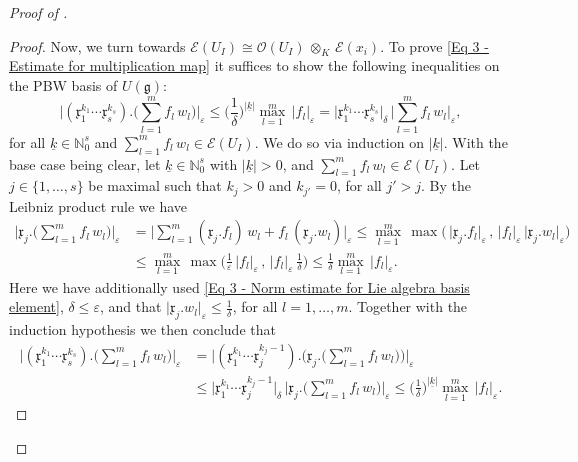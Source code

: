\documentclass[a4paper, reqno, 10pt]{amsart}
\theoremstyle{definition}
\numberwithin{equation}{section}
\newcommand{\abs}[1]{{\lvert{#1}\rvert}}
\newcommand{\botimes}[1]{{\,\otimes_{#1}\,}}
\newcommand{\ul}[1]{{\underline{#1}}}
\newcommand{\BN}{{\mathbb {N}}}
\newcommand{\CE}{{\mathcal {E}}}
\newcommand{\CO}{{\mathcal {O}}}
\newcommand{\Fg}{{\mathfrak {g}}}
\newcommand{\Fx}{{\mathfrak {x}}}
\begin{document}
\begin{proof}[{Proof of }]
\begin{proof}
	Now, we turn towards $\CE(U_I) \cong \CO(U_I) \botimes{K} \CE(x_i)$.
	To prove \eqref{Eq 3 - Estimate for multiplication map} it suffices to show the following inequalities on the PBW basis of $U(\Fg)$:
	\begin{equation*}
		\bigg\lvert (\Fx_1^{k_1} \cdots \Fx_s^{k_s}) . \bigg(\sum_{l=1}^m f_l \,w_l \bigg) \bigg\rvert_\varepsilon
		\leq \bigg(\frac{1}{\delta} \bigg)^{\abs{\ul{k}}} \max_{l=1}^m \, \lvert f_l \rvert_\varepsilon
		= \lvert \Fx_1^{k_1} \cdots \Fx_s^{k_s} \rvert_\delta \, \bigg\lvert \sum_{l=1}^m f_l \,w_l \bigg\rvert_\varepsilon ,
	\end{equation*}
	for all $\ul{k} \in \BN_0^s$ and $ \sum_{l=1}^m f_l \,w_l\in \CE(U_I)$.
	We do so via induction on $\abs{\ul{k}}$.
	With the base case being clear, let $\ul{k} \in \BN^s_0$ with $\abs{\ul{k}}>0$, and $\sum_{l=1}^m f_l\, w_l \in \CE(U_I)$.
	Let $j\in \{1,\ldots,s\}$ be maximal such that $k_j > 0$ and $k_{j'} =0$, for all $j' > j$.
	By the Leibniz product rule we have 
	\begin{align*}
		\bigg\lvert \Fx_j . \bigg( \sum_{l=1}^m f_l \, w_l \bigg) \bigg\rvert_\varepsilon
		&= \bigg\lvert \sum_{l=1}^m (\Fx_j. f_l)\, w_l + f_l \,(\Fx_j .w_l) \bigg\rvert_\varepsilon 
		\leq \max_{l=1}^m \, \max \big( \, \lvert \Fx_j .f_l \rvert_\varepsilon \,,\, \lvert f_l \rvert_\varepsilon \, \lvert \Fx_j. w_l \rvert_\varepsilon \big) \\
		&\leq \max_{l=1}^m \, \max \bigg( \frac{1}{\varepsilon} \, \lvert f_l \rvert_\varepsilon \,,\, \lvert f_l \rvert_\varepsilon  \,\frac{1}{\delta} \bigg)
		\leq \frac{1}{\delta}  \max_{l=1}^m \, \lvert f_l \rvert_\varepsilon .
	\end{align*}
	Here we have additionally used \eqref{Eq 3 - Norm estimate for Lie algebra basis element}, $\delta \leq \varepsilon $, and that $\lvert \Fx_j. w_l \rvert_\varepsilon \leq \frac{1}{\delta}$, for all $l=1,\ldots,m$.
	Together with the induction hypothesis we then conclude that
	\begin{align*}
		\bigg\lvert (\Fx_1^{k_1}\cdots \Fx_s^{k_s}) . \bigg( \sum_{l=1}^m f_l \, w_l  \bigg) \bigg\rvert_\varepsilon
		&= \Bigg\lvert (\Fx_1^{k_1}\cdots \Fx_j^{k_j-1 }) . \Bigg( \Fx_j . \bigg( \sum_{l=1}^m f_l \, w_l \bigg) \Bigg) \Bigg\rvert_\varepsilon \\
		&\leq \lvert \Fx_1^{k_1}\cdots \Fx_j^{k_j-1 } \rvert_\delta \, \bigg\lvert \Fx_j . \bigg( \sum_{l=1}^m f_l \, w_l  \bigg) \bigg\rvert_\varepsilon
		\leq \bigg(\frac{1}{\delta}\bigg)^{\abs{\ul{k}}} \max_{l=1}^m  \, \lvert f_l \rvert_\varepsilon .
	\end{align*}
\end{proof}




\end{proof}
\end{document}

